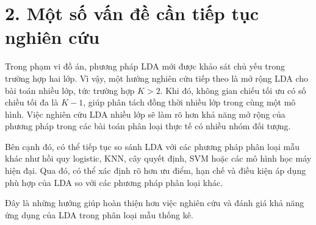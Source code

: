 \section*{2. Một số vấn đề cần tiếp tục nghiên cứu}

Trong phạm vi đồ án, phương pháp LDA mới được khảo sát chủ yếu trong trường hợp hai lớp. Vì vậy, một hướng nghiên cứu tiếp theo là mở rộng LDA cho bài toán nhiều lớp, tức trường hợp \(K>2\). Khi đó, không gian chiếu tối ưu có số chiều tối đa là \(K-1\), giúp phân tách đồng thời nhiều lớp trong cùng một mô hình. Việc nghiên cứu LDA nhiều lớp sẽ làm rõ hơn khả năng mở rộng của phương pháp trong các bài toán phân loại thực tế có nhiều nhóm đối tượng.

Bên cạnh đó, có thể tiếp tục so sánh LDA với các phương pháp phân loại mẫu khác như hồi quy logistic, KNN, cây quyết định, SVM hoặc các mô hình học máy hiện đại. Qua đó, có thể xác định rõ hơn ưu điểm, hạn chế và điều kiện áp dụng phù hợp của LDA so với các phương pháp phân loại khác.

Đây là những hướng giúp hoàn thiện hơn việc nghiên cứu và đánh giá khả năng ứng dụng của LDA trong phân loại mẫu thống kê.


